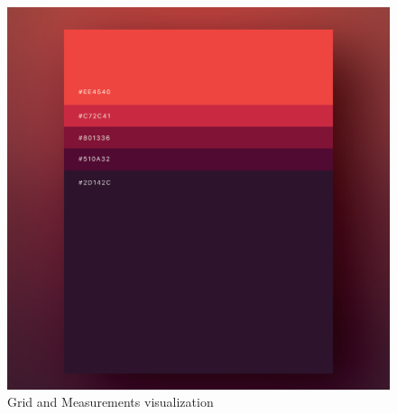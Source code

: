 \begin{figure}[!ht]
    \centering
    \includegraphics[width=1.0\textwidth]{./images/colorPalette.png}
    \caption{Grid and Measurements visualization}
    \label{fig:colorPalette}
\end{figure}
